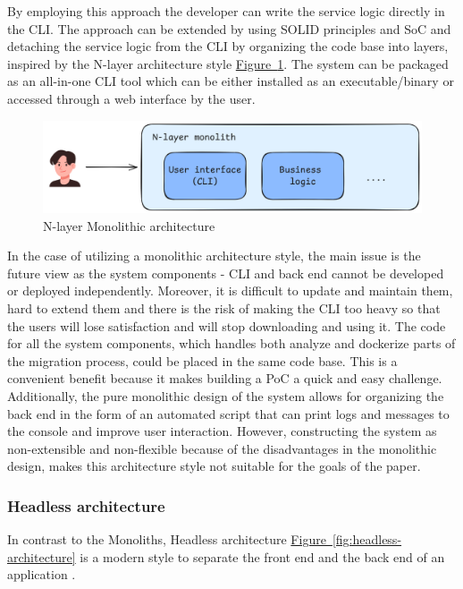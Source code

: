 \documentclass[twocolumn]{article}
\newcommand{\FigRef}[1]{\hyperref[#1]{Figure~\ref{#1}}}
\begin{document}
By employing this approach the developer can write the service logic directly in the CLI. The approach can be extended by using SOLID principles and SoC and detaching the service logic from the CLI by organizing the code base into layers, inspired by the N-layer architecture style \FigRef{fig:n-layer-monolithic-architecture}. The system can be packaged as an all-in-one CLI tool which can be either installed as an executable/binary or accessed through a web interface by the user.

\begin{figure}[H]
    \centering
    \includegraphics[width=\linewidth]{images/n-layer-architecture.png}
    \caption{N-layer Monolithic architecture}
    \label{fig:n-layer-monolithic-architecture}
\end{figure}

In the case of utilizing a monolithic architecture style, the main issue is the future view as the system components - CLI and back end cannot be developed or deployed independently. Moreover, it is difficult to update and maintain them, hard to extend them and there is the risk of making the CLI too heavy so that the users will lose satisfaction and will stop downloading and using it. The code for all the system components, which handles both analyze and dockerize parts of the migration process, could be placed in the same code base. This is a convenient benefit because it makes building a PoC a quick and easy challenge. \\

Additionally, the pure monolithic design of the system allows for organizing the back end in the form of an automated script that can print logs and messages to the console and improve user interaction. However, constructing the system as non-extensible and non-flexible because of the disadvantages in the monolithic design, makes this architecture style not suitable for the goals of the paper.

\subsubsection{Headless architecture}
In contrast to the Monoliths, Headless architecture \FigRef{fig:headless-architecture} is a modern style to separate the front end and the back end of an application \cite{Pachiyappan-2020}.
\end{document}
